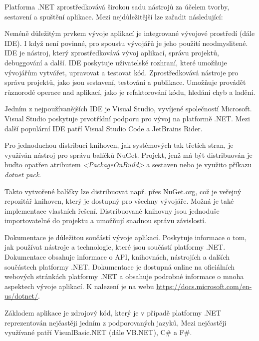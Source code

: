 Platforma .NET zprostředkovává širokou sadu nástrojů za účelem tvorby, sestavení a spuštění aplikace. Mezi nejdůležitější lze zařadit následující:


Neméně důležitým prvkem vývoje aplikací je integrované vývojové prostředí (dále IDE). I když není povinné, pro spoustu vývojářů je jeho použití neodmyslitené. IDE je nástroj, který zprostředkovává vývoj aplikací, správu projektů, debuggování a další. IDE poskytuje uživatelské rozhraní, které umožňuje vývojářům vytvářet, upravovat a testovat kód. Zprostředkovává nástroje pro správu projektů, jako jsou sestavení, testování a publikace. Umožňuje provádět různorodé operace nad aplikací, jako je refaktorování kódu, hledání chyb a ladění.

Jedním z nejpoužívanějších IDE je Visual Studio, vyvíjené společností Microsoft. Visual Studio poskytuje prvotřídní podporu pro vývoj na platformě .NET. Mezi další populární IDE patří Visual Studio Code a JetBrains Rider.


Pro jednoduchou distribuci knihoven, jak systémových tak třetích stran, je využíván nástroj pro správu balíčků NuGet. Projekt, jenž má být distribuován je buďto opatřen atributem \emph{<PackageOnBuild>} a sestaven nebo je využito příkazu \emph{dotnet pack}.

Takto vytvořené balíčky lze distribuovat např. přes NuGet.org, což je veřejný repozitář knihoven, který je dostupný pro všechny vývojáře. Možná je také implementace vlastních řešení. Distribuované knihovny jsou jednoduše importovatelné do projektu a umožňují snadnou správu závislostí.


Dokumentace je důležitou součástí vývoje aplikací. Poskytuje informace o tom, jak používat nástroje a technologie, které jsou součástí platformy .NET. Dokumentace obsahuje informace o API, knihovnách, nástrojích a dalších součástech platformy .NET. Dokumentace je dostupná online na oficiálních webových stránkách platformy .NET a obsahuje podrobné informace o mnoha aspektech vývoje aplikací. K nalezení je na webu \url{https://docs.microsoft.com/en-us/dotnet/}.


Základem aplikace je zdrojový kód, který je v případě platformy .NET reprezentován nejčastěji jedním z podporovaných jazyků, Mezi nejčastěji využívané patří VisualBasic.NET (dále VB.NET), C\# a F\#.


